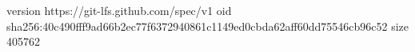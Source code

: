version https://git-lfs.github.com/spec/v1
oid sha256:40c490fff9ad66b2ec77f6372940861c1149ed0cbda62aff60dd75546cb96c52
size 405762
